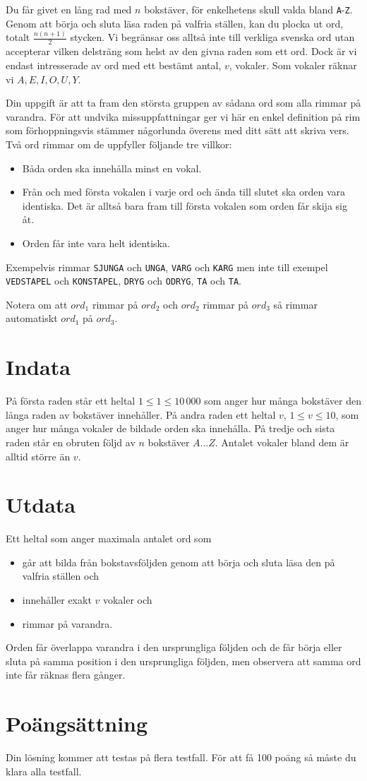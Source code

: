 
Du får givet en lång rad med $n$ bokstäver, för enkelhetens skull valda bland \texttt{A}-\texttt{Z}. Genom att börja och sluta läsa raden på valfria ställen, kan du plocka ut ord, totalt $\frac{n(n+1)}{2}$ stycken. Vi begränsar oss alltså inte till verkliga svenska ord utan accepterar vilken delsträng som helst av den givna raden som ett ord. Dock är vi endast intresserade av ord med ett bestämt antal, $v$, vokaler. Som vokaler räknar vi $A, E, I, O, U, Y$.

Din uppgift är att ta fram den största gruppen av sådana ord som alla rimmar på varandra. För att undvika missuppfattningar ger vi här en enkel definition på rim som förhoppningsvis stämmer någorlunda överens med ditt sätt att skriva vers. Två ord rimmar om de uppfyller följande tre villkor:

\begin{itemize}
	\item Båda orden ska innehålla minst en vokal.
	\item Från och med första vokalen i varje ord och ända till slutet ska orden vara identiska. Det är alltså bara fram till första vokalen som orden får skija sig åt.
	\item Orden får inte vara helt identiska.
\end{itemize}

Exempelvis rimmar \texttt{SJUNGA} och \texttt{UNGA}, \texttt{VARG} och \texttt{KARG} men inte till exempel \texttt{VEDSTAPEL} och \texttt{KONSTAPEL}, \texttt{DRYG} och \texttt{ODRYG}, \texttt{TA} och \texttt{TA}.

Notera om att $ord_1$ rimmar på $ord_2$ och $ord_2$ rimmar på $ord_3$ så rimmar automatiskt $ord_1$ på $ord_3$.

\section*{Indata}
På första raden står ett heltal $1 \le 1 \le 10\,000$ som anger hur många bokstäver den långa raden av bokstäver innehåller. På andra raden ett heltal $v$, $1 \le v \le 10$, som anger hur många vokaler de bildade orden ska innehålla. På tredje och sista raden står en obruten följd av $n$ bokstäver $A...Z$. Antalet vokaler bland dem är alltid större än $v$.

\section*{Utdata}
Ett heltal som anger maximala antalet ord som
\begin{itemize}
	\item går att bilda från bokstavsföljden genom att börja och sluta läsa den på valfria ställen och
	\item innehåller exakt $v$ vokaler och
	\item rimmar på varandra.
\end{itemize}
Orden får överlappa varandra i den ursprungliga följden och de får börja eller sluta på samma position i den ursprungliga följden, men observera att samma ord inte får räknas flera gånger.

\section*{Poängsättning}
Din lösning kommer att testas på flera testfall. För att få 100 poäng så måste du klara alla testfall.
